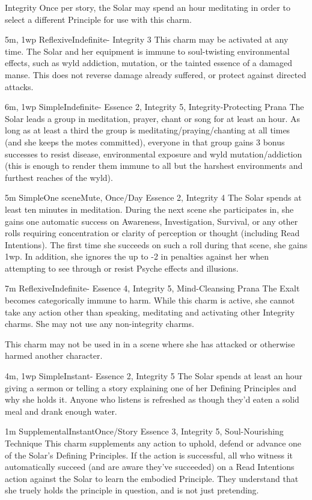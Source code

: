 \begin{Ability}{Integrity}
  Once per story, the Solar may spend an hour meditating in order to select a different Principle for use with this charm.

  {5m, 1wp}
  {Reflexive}{Indefinite}{-}
  {Integrity 3}
  This charm may be activated at any time. The Solar and her equipment is immune to soul-twisting environmental effects, such as wyld addiction, mutation, or the tainted essence of a damaged manse. This does not reverse damage already suffered, or protect against directed attacks.

  {6m, 1wp}
  {Simple}{Indefinite}{-}
  {Essence 2, Integrity 5, Integrity-Protecting Prana}
  The Solar leads a group in meditation, prayer, chant or song for at least an hour. As long as at least a third the group is meditating/praying/chanting at all times (and she keeps the motes committed), everyone in that group gains 3 bonus successes to resist disease, environmental exposure and wyld mutation/addiction (this is enough to render them immune to all but the harshest environments and furthest reaches of the wyld).

  {5m}
  {Simple}{One scene}{Mute, Once/Day}
  {Essence 2, Integrity 4}
  The Solar spends at least ten minutes in meditation. During the next scene she participates in, she gains one automatic success on Awareness, Investigation, Survival, or any other rolls requiring concentration or clarity of perception or thought (including Read Intentions). The first time she succeeds on such a roll during that scene, she gains 1wp. In addition, she ignores the up to -2 in penalties against her when attempting to see through or resist Psyche effects and illusions.

  {7m}
  {Reflexive}{Indefinite}{-}
  {Essence 4, Integrity 5, Mind-Cleansing Prana}
  The Exalt becomes categorically immune to harm. While this charm is active, she cannot take any action other than speaking, meditating and activating other Integrity charms. She may not use any non-integrity charms.

  This charm may not be used in in a scene where she has attacked or otherwise harmed another character.

  {4m, 1wp}
  {Simple}{Instant}{-}
  {Essence 2, Integrity 5}
  The Solar spends at least an hour giving a sermon or telling a story explaining one of her Defining Principles and why she holds it. Anyone who listens is refreshed as though they'd eaten a solid meal and drank enough water.

  {1m}
  {Supplemental}{Instant}{Once/Story}
  {Essence 3, Integrity 5, Soul-Nourishing Technique}
  This charm supplements any action to uphold, defend or advance one of the Solar's Defining Principles. If the action is successful, all who witness it automatically succeed (and are aware they've succeeded) on a Read Intentions action against the Solar to learn the embodied Principle. They understand that she truely holds the principle in question, and is not just pretending.
\end{Ability}

